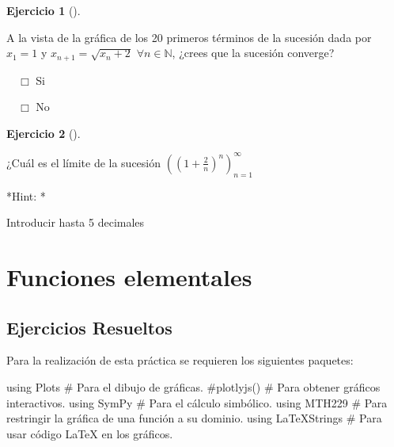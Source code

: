 \documentclass[
  a4paper,
]{scrreport}
\newenvironment{Shaded}{\begin{snugshade}}{\end{snugshade}}
\newcommand{\BuiltInTok}[1]{\textcolor[rgb]{0.00,0.23,0.31}{#1}}
\newcommand{\CommentTok}[1]{\textcolor[rgb]{0.37,0.37,0.37}{#1}}
\newcommand{\ImportTok}[1]{\textcolor[rgb]{0.00,0.46,0.62}{#1}}
\theoremstyle{definition}
\newtheorem{exercise}{Ejercicio}[chapter]
\theoremstyle{remark}
\begin{document}
\leavevmode{}%
\begin{exercise}[]\label{exr-sucesiones-propuesto-6}

A la vista de la gráfica de los 20 primeros términos de la sucesión dada
por \(x_1=1\) y \(x_{n+1}=\sqrt{x_n+2}\) \(\forall n\in \mathbb{N}\),
¿crees que la sucesión converge?

${\quad\Box}$ Si

${\quad\Box}$ No

\end{exercise}

\leavevmode{}%
\begin{exercise}[]\label{exr-sucesiones-propuesto-7}

¿Cuál es el límite de la sucesión
\(\left(\left(1+\frac{2}{n}\right)^n\right)_{n=1}^\infty\)

\vspace{18pt}*Hint: *

Introducir hasta 5 decimales

\end{exercise}


\hypertarget{funciones-elementales}{%
\chapter{Funciones elementales}\label{funciones-elementales}}

\hypertarget{ejercicios-resueltos-1}{%
\section{Ejercicios Resueltos}\label{ejercicios-resueltos-1}}

Para la realización de esta práctica se requieren los siguientes
paquetes:

\begin{Shaded}
\begin{Highlighting}[]
\ImportTok{using} \BuiltInTok{Plots  }\CommentTok{\# Para el dibujo de gráficas.}
\CommentTok{\#plotlyjs()  \# Para obtener gráficos interactivos.}
\ImportTok{using} \BuiltInTok{SymPy }\CommentTok{\# Para el cálculo simbólico.}
\ImportTok{using} \BuiltInTok{MTH229 }\CommentTok{\# Para restringir la gráfica de una función a su dominio.}
\ImportTok{using} \BuiltInTok{LaTeXStrings  }\CommentTok{\# Para usar código LaTeX en los gráficos.}
\end{Highlighting}
\end{Shaded}
\end{document}
